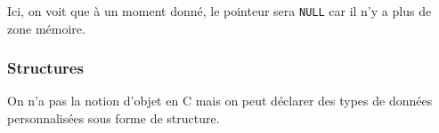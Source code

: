 \begin{Shaded}
\begin{Highlighting}[]
\OperatorTok{(}\OperatorTok{,}  \OperatorTok{**}\OperatorTok{)} \OperatorTok{\{} 
    
     \OperatorTok{**}\OperatorTok{;}\OperatorTok{=}\OperatorTok{;} 
\OperatorTok{(}\OperatorTok{);} 
    \OperatorTok{(*}\OperatorTok{!=}\OperatorTok{)} \OperatorTok{\{} 
\OperatorTok{(}\OperatorTok{,*}\OperatorTok{);} 
\OperatorTok{++;}
    \OperatorTok{\}}
\OperatorTok{(}\OperatorTok{);}
    \OperatorTok{(}\OperatorTok{);}
\OperatorTok{\}}
\end{Highlighting}
\end{Shaded}

Ici, on voit que à un moment donné, le pointeur sera \texttt{NULL} car
il n'y a plus de zone mémoire.

\subsubsection{Structures}\label{structures}

On n'a pas la notion d'objet en C mais on peut déclarer des types de
données personnalisées sous forme de structure.

\begin{Shaded}
\begin{Highlighting}[]
\OperatorTok{\{}
    \OperatorTok{;}
    \OperatorTok{;}
    \OperatorTok{;}
\OperatorTok{\}}

\OperatorTok{=} \OperatorTok{\{}\OperatorTok{,} \OperatorTok{,} \OperatorTok{\};}
\OperatorTok{;}\OperatorTok{;}\OperatorTok{;}
\end{Highlighting}
\end{Shaded}

